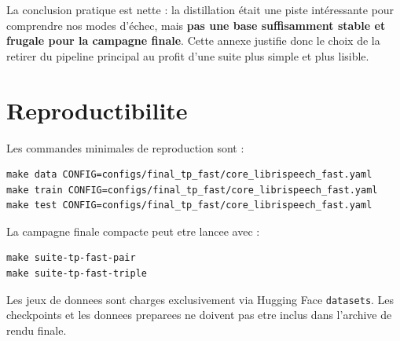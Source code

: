 \documentclass[11pt,a4paper]{article}
\begin{document}
La conclusion pratique est nette : la distillation \'etait une piste int\'eressante pour comprendre nos modes d'\'echec, mais \textbf{pas une base suffisamment stable et frugale pour la campagne finale}. Cette annexe justifie donc le choix de la retirer du pipeline principal au profit d'une suite plus simple et plus lisible.

\section{Reproductibilite}
Les commandes minimales de reproduction sont :
\begin{verbatim}
make data CONFIG=configs/final_tp_fast/core_librispeech_fast.yaml
make train CONFIG=configs/final_tp_fast/core_librispeech_fast.yaml
make test CONFIG=configs/final_tp_fast/core_librispeech_fast.yaml
\end{verbatim}

La campagne finale compacte peut etre lancee avec :
\begin{verbatim}
make suite-tp-fast-pair
make suite-tp-fast-triple
\end{verbatim}

Les jeux de donnees sont charges exclusivement via Hugging Face \texttt{datasets}. Les checkpoints et les donnees preparees ne doivent pas etre inclus dans l'archive de rendu finale.
\end{document}
